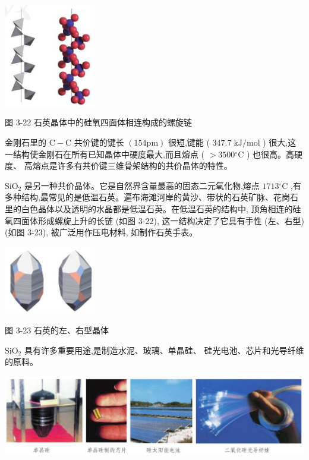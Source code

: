 \documentclass[10pt]{article}
\begin{document}
\begin{center}
\includegraphics[max width=0.3\textwidth]{images/0190e026-5a11-7df7-bd27-54d09026ba7a_84_588925.jpg}
\end{center}

图 3-22 石英晶体中的硅氧四面体相连构成的螺旋链

金刚石里的 \(\mathrm{C} - \mathrm{C}\) 共价键的键长 \(\left( {{154}\mathrm{{pm}}}\right)\) 很短,键能 ( \({347.7}\mathrm{\;{kJ}}/\mathrm{{mol}}\) ) 很大,这一结构使金刚石在所有已知晶体中硬度最大,而且熔点 ( \(> {3500}{}^{ \circ }\mathrm{C}\) ) 也很高。高硬度、 高熔点是许多有共价键三维骨架结构的共价晶体的特性。

\({\mathrm{{SiO}}}_{2}\) 是另一种共价晶体。它是自然界含量最高的固态二元氧化物,熔点 \({1713}{}^{ \circ }\mathrm{C}\) ,有多种结构,最常见的是低温石英。遍布海滩河岸的黄沙、带状的石英矿脉、花岗石里的白色晶体以及透明的水晶都是低温石英。在低温石英的结构中, 顶角相连的硅氧四面体形成螺旋上升的长链 (如图 3-22), 这一结构决定了它具有手性 (左、右型) (如图 3-23), 被广泛用作压电材料, 如制作石英手表。

\begin{center}
\includegraphics[max width=0.3\textwidth]{images/0190e026-5a11-7df7-bd27-54d09026ba7a_85_289011.jpg}
\end{center}

图 3-23 石英的左、右型晶体

\({\mathrm{{SiO}}}_{2}\) 具有许多重要用途,是制造水泥、玻璃、单晶硅、 硅光电池、芯片和光导纤维的原料。

\begin{center}
\includegraphics[max width=1.0\textwidth]{images/0190e026-5a11-7df7-bd27-54d09026ba7a_85_283745.jpg}
\end{center}
\end{document}
